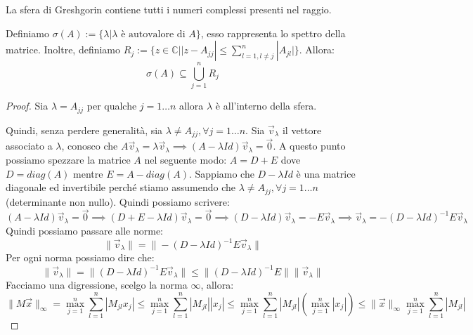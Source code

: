 La sfera di Greshgorin contiene tutti i numeri complessi presenti nel raggio. 

\begin{teorema} 
    Definiamo $\sigma(A):=\{\lambda | \lambda\text{ è autovalore di }A\}$, esso
    rappresenta lo spettro della matrice. Inoltre, definiamo $R_j:=\{z\in \mathbb{C}|
        |z-A_{jj}| \leq \sum_{l=1, l\neq j}^{n} |A_{jl}|\}$.
    Allora:
    \begin{equation*}
        \sigma(A) \subseteq \bigcup_{j=1}^{n} R_j
    \end{equation*}
    \begin{proof}
        Sia $\lambda = A_{jj}$ per qualche $j = 1 \dots n$ allora $\lambda$ è
        all'interno della sfera.

        Quindi, senza perdere generalità, sia $\lambda \neq A_{jj}, \forall j= 1 \dots n$.
        Sia $\vec{v}_\lambda$ il vettore associato a $\lambda$, conosco che
        $A \vec{v}_\lambda = \lambda \vec{v}_\lambda \implies (A - \lambda Id)
            \vec{v}_\lambda = \vec{0}$. A questo punto possiamo spezzare la matrice 
        $A$ nel seguente modo: $A = D + E$ dove $D = diag(A)$ mentre $E = A - diag(A)$. 
        Sappiamo che $D - \lambda Id$ è una matrice diagonale ed invertibile 
        perché stiamo assumendo che $\lambda \neq A_{jj}, \forall j = 1 \dots n$ (determinante non nullo).
        Quindi possiamo scrivere:
        \begin{equation*}
            (A - \lambda Id)\vec{v}_\lambda = \vec{0} \implies (D + E - \lambda 
            Id)\vec{v}_\lambda = \vec{0} \implies (D - \lambda Id)\vec{v}_\lambda 
            = - E\vec{v}_\lambda \implies \vec{v}_\lambda = -(D - \lambda Id)^{-1}
            E\vec{v}_\lambda
        \end{equation*}
        Quindi possiamo passare alle norme:
        \begin{equation*}
            \|\vec{v}_\lambda\| = \|-(D - \lambda Id)^{-1}E\vec{v}_\lambda\|
        \end{equation*}
        Per ogni norma possiamo dire che:
        \begin{equation*}
            \|\vec{v}_\lambda\| = \|(D - \lambda Id)^{-1}E\vec{v}_\lambda\| \leq
            \|(D - \lambda Id)^{-1}E\| \|\vec{v}_\lambda\|
        \end{equation*}
        Facciamo una digressione, scelgo la norma $\infty$, allora:
        \begin{equation*}
            \|M\vec{x}\|_\infty = \max_{j = 1}^n \sum_{l = 1}^{n}|M_{jl}x_j| \leq
             \max_{j = 1}^n\sum_{l = 1}^{n}|M_{jl}||x_j|\leq \max_{j = 1}^n
             \sum_{l = 1}^{n}|M_{jl}|(\max_{j = 1}^n|x_j|)\leq \|\vec{x}\|_\infty
             \max_{j = 1}^n\sum_{l = 1}^{n}|M_{jl}|
        \end{equation*}


\end{proof}
\end{teorema}
